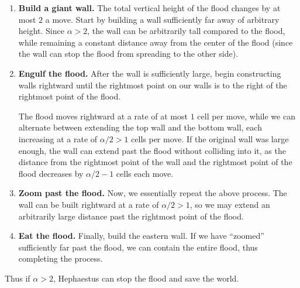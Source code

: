 \begin{enumerate}[label=\Roman*.]
    \item \textbf{Build a giant wall.} The total vertical height of the flood changes by at most $2$ a move. Start by building a wall sufficiently far away of arbitrary height. Since $\alpha>2$, the wall can be arbitrarily tall compared to the flood, while remaining a constant distance away from the center of the flood (since the wall can stop the flood from spreading to the other side).
    \item \textbf{Engulf the flood.} After the wall is sufficiently large, begin constructing walls rightward until the rightmost point on our walls is to the right of the rightmost point of the flood.

        The flood moves rightward at a rate of at most $1$ cell per move, while we can alternate between extending the top wall and the bottom wall, each increasing at a rate of $\alpha/2>1$ cells per move. If the original wall was large enough, the wall can extend past the flood without colliding into it, as the distance from the rightmost point of the wall and the rightmost point of the flood decreases by $\alpha/2-1$ cells each move.
    \item \textbf{Zoom past the flood.} Now, we essentially repeat the above process. The wall can be built rightward at a rate of $\alpha/2>1$, so we may extend an arbitrarily large distance past the rightmost point of the flood.
    \item \textbf{Eat the flood.} Finally, build the eastern wall. If we have ``zoomed'' sufficiently far past the flood, we can contain the entire flood, thus completing the process.
\end{enumerate}
Thus if $\alpha>2$, Hephaestus can stop the flood and save the world.

\bigskip

